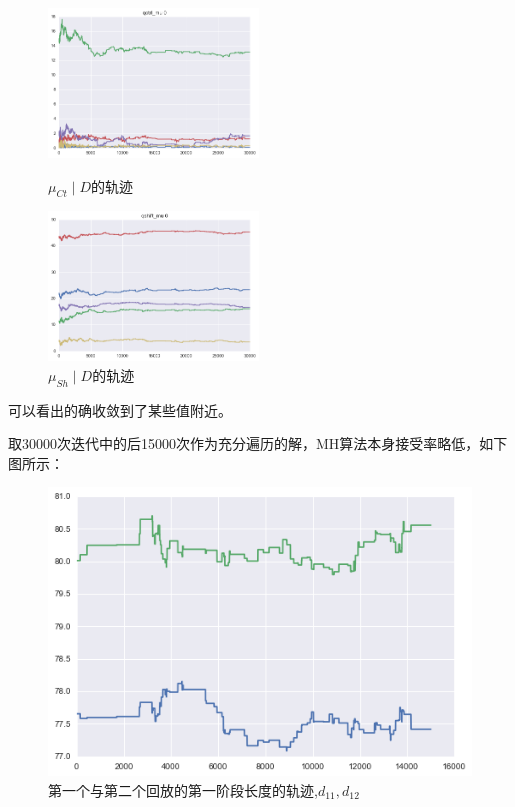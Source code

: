\documentclass[UTF8]{ctexart}
\begin{document}
\begin{figure}[H]
\begin{minipage}[t]{0.5\linewidth}
\centering
\includegraphics[width=2.2in]{images/traceCtrl.png}
\caption{$\mu_{Ct} \mid D $的轨迹}
\end{minipage}%
\begin{minipage}[t]{0.5\linewidth}
\centering
\includegraphics[width=2.2in]{images/traceShift.png}
\caption{$\mu_{Sh} \mid D$的轨迹}
\end{minipage}
\end{figure}

可以看出的确收敛到了某些值附近。

取30000次迭代中的后15000次作为充分遍历的解，MH算法本身接受率略低，如下图所示：

\begin{figure}[H]
\centering
\includegraphics[width=\linewidth]{images/traceTwice.png}
\caption{第一个与第二个回放的第一阶段长度的轨迹,$d_{11},d_{12}$}
\end{figure}
\end{document}
